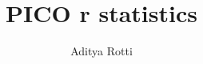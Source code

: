 \documentclass[11pt]{article}
\begin{document}
\title{PICO r statistics}
\author{Aditya Rotti}
\date{}
\maketitle


\newpage


%
%
\end{document}
